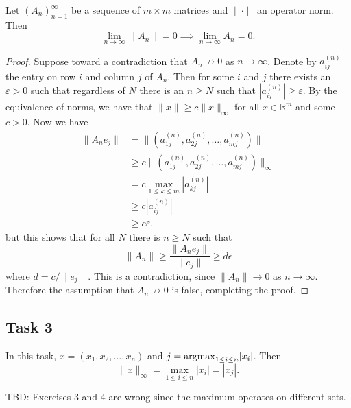 \documentclass[a4paper,12pt]{article}
\begin{document}
\begin{proposition}
  Let \((A_n)_{n=1}^\infty\) be a sequence of \(m \times m\) matrices and
  \(\|\cdot\|\) an operator norm.
  Then
  \[ \lim_{n \to \infty} \|A_n\| = 0 \implies \lim_{n \to \infty} A_n = 0. \]
\end{proposition}
\begin{proof}
  Suppose toward a contradiction that \(A_n \not \to 0\) as \(n \to \infty\).
  Denote by \(a_{ij}^{(n)}\) the entry on row \(i\) and column \(j\) of \(A_n\).
  Then for some \(i\) and \(j\) there exists an \(\varepsilon > 0\) such that
  regardless of \(N\) there is an \(n \ge N\) such that
  \(|a_{ij}^{(n)}| \ge \varepsilon\).
  By the equivalence of norms, we have that \(\|x\| \ge c\|x\|_\infty\) for all
  \(x \in \mathbb{R}^m\) and some \(c > 0\).
  Now we have
  \begin{align*}
    \|A_n e_j\|
      &= \|(a^{(n)}_{1j}, a^{(n)}_{2j}, \dots, a^{(n)}_{mj})\| \\
      &\ge c\|(a^{(n)}_{1j}, a^{(n)}_{2j}, \dots, a^{(n)}_{mj})\|_\infty \\
      &= c \max_{1 \le k \le m} |a_{kj}^{(n)}| \\
      &\ge c |a^{(n)}_{ij}| \\
      &\ge c \varepsilon,
  \end{align*}
  but this shows that for all \(N\) there is \(n \ge N\) such that
  \[
    \|A_n\|
      \ge \frac{\|A_n e_j\|}{\|e_j\|}
      \ge d\epsilon
  \]
  where \(d = c/\|e_j\|\).
  This is a contradiction, since \(\|A_n\| \to 0\) as \(n \to \infty\).
  Therefore the assumption that \(A_n \not \to 0\) is false, completing the
  proof.
\end{proof}


\subsection*{Task 3}

In this task, \(x = (x_1,x_2,\dots,x_n)\) and
\(j = \mathrm{argmax}_{1 \le i \le n} |x_i|\).
Then
\[ \|x\|_\infty = \max_{1 \le i \le n} |x_i| = |x_j|. \]

TBD: Exercises 3 and 4 are wrong since the maximum operates on different
sets.
\end{document}
